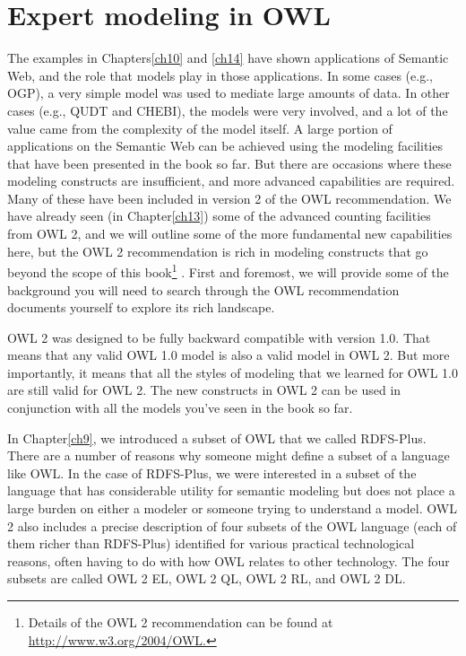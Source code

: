 \chapter{Expert modeling in OWL}
\label{ch16}

The examples in Chapters\ref{ch10} and \ref{ch14} have shown applications of Semantic
Web, and the role that models play in those applications. In some cases
(e.g., OGP), a very simple model was used to mediate large amounts of
data. In other cases (e.g., QUDT and CHEBI), the models were very
involved, and a lot of the value came from the complexity of the model
itself. A large portion of applications on the Semantic Web can be
achieved using the modeling facilities that have been presented in the
book so far. But there are occasions where these modeling constructs are
insufficient, and more advanced capabilities are required. Many of these
have been included in version 2 of the OWL recommendation. We have already
seen (in Chapter\ref{ch13}) some of the advanced counting facilities from OWL
2, and we will outline some of the more fundamental new capabilities
here, but the OWL 2 recommendation is rich in modeling constructs that go
beyond the scope of this book\footnote{Details of the OWL 2 recommendation can be found at
\href{http://www.w3.org/2004/OWL}{http://www.w3.org/2004/OWL.}}
. First and foremost, we will provide some
of the background you will need to search through the OWL recommendation
documents yourself to explore its rich landscape.

OWL 2 was designed to be fully backward compatible with version 1.0.
That means that any valid OWL 1.0 model is also a valid model in OWL 2.
But more importantly, it means that all the styles of modeling that we
learned for OWL 1.0 are still valid for OWL 2. The new constructs in OWL
2 can be used in conjunction with all the models you've seen in the book
so far.

In Chapter\ref{ch9}, we introduced a subset of OWL that we called RDFS-Plus.
There are a number of reasons why someone might define a subset of a
language like OWL. In the case of RDFS-Plus, we were interested in a
subset of the language that has considerable utility for semantic
modeling but does not place a large burden on either a modeler or
someone trying to understand a model. OWL 2 also includes a precise
description of four subsets of the OWL language (each of them richer
than RDFS-Plus) identified for various practical technological reasons,
often having to do with how OWL relates to other technology. The four
subsets are called OWL 2 EL, OWL 2 QL, OWL 2 RL, and OWL 2 DL.


